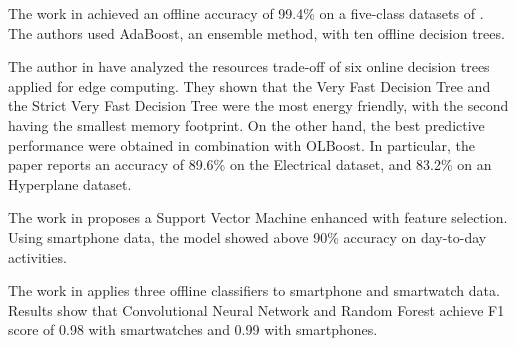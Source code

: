 The work in \cite{ugulino2012} achieved an offline accuracy of 99.4\% on a
five-class datasets of \har. The authors used AdaBoost, an ensemble method, with
ten offline decision trees.

The author in \cite{lopes2020evaluating} have analyzed the resources trade-off
of six online decision trees applied for edge computing. They shown that the
Very Fast Decision Tree and the Strict Very Fast Decision Tree were the most
energy friendly, with the second having the smallest memory footprint. On the
other hand, the best predictive performance were obtained in combination with
OLBoost. In particular, the paper reports an accuracy of 89.6\% on the Electrical
dataset, and 83.2\% on an Hyperplane dataset.

The work in \cite{ahmed2019smartphone} proposes a Support Vector Machine
enhanced with feature selection. Using smartphone data, the model showed above
90\% accuracy on day-to-day activities.

The work in \cite{san2018robust} applies three offline classifiers to smartphone
and smartwatch data. Results show that Convolutional Neural Network and Random
Forest achieve F1 score of 0.98 with smartwatches and 0.99 with smartphones.




